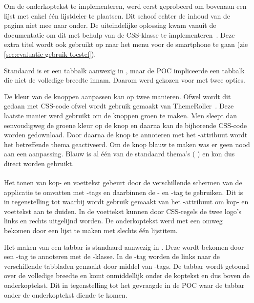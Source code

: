 Om de onderkoptekst te implementeren, werd eerst geprobeerd om bovenaan een lijst met enkel één lijstdeler te plaatsen.
Dit schoof echter de inhoud van de pagina niet mee naar onder. 
De uiteindelijke oplossing kwam vanuit de documentatie om dit met behulp van de CSS-klasse  te implementeren~\cite{JQuery2013b}. 
Deze extra titel wordt ook gebruikt op naar het menu voor de smartphone te gaan (zie \ref{sec:evaluatie-gebruik-toestel}).

Standaard is er een tabbalk aanwezig in \jqm, maar de POC impliceerde een tabbalk die niet de volledige breedte innam.
Daarom werd gekozen voor  met twee opties.

De kleur van de knoppen aanpassen kan op twee manieren. 
Ofwel wordt dit gedaan met CSS-code ofwel wordt gebruik gemaakt van ThemeRoller~\cite{JQuery2012c}. 
Deze laatste manier werd gebruikt om de knoppen groen te maken. 
Men sleept dan eenvoudigweg de groene kleur op de knop en daarna kan de bijhorende CSS-code worden gedownload. 
Door daarna de knop te annoteren met het -attribuut wordt het betreffende thema geactiveerd. 
Om de knop blauw te maken was er geen nood aan een aanpassing.
Blauw is al één van de standaard thema's ( ) en kon dus direct worden gebruikt.

\paragraph{\lungo}
Het tonen van kop- en voettekst gebeurt door de verschillende schermen van de applicatie te omvatten met -tags en daarbinnen de - en -tag te gebruiken.
Dit is in tegenstelling tot \jqm{} waarbij wordt gebruik gemaakt van het -attribuut om kop- en voettekst aan te duiden.
In de voettekst kunnen door CSS-regels de twee logo's links en rechts uitgelijnd worden.
De onderkoptekst werd met een omweg bekomen door een lijst te maken met slechts één lijstitem.

Het maken van een tabbar is standaard aanwezig in \lungo{}.
Deze wordt bekomen door een -tag te annoteren met de -klasse.
In de -tag worden de links naar de verschillende tabbladen gemaakt door middel van -tags.
De tabbar wordt getoond over de volledige breedte en komt onmiddellijk onder de koptekst en dus boven de onderkoptekst.
Dit in tegenstelling tot het gevraagde in de POC waar de tabbar onder de onderkoptekst diende te komen.

